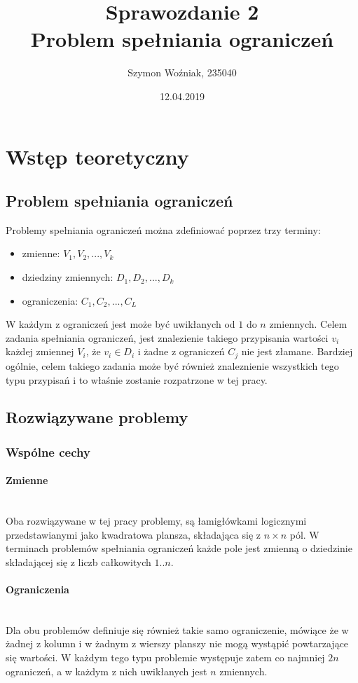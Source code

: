 \documentclass{article}
\author{Szymon Woźniak, 235040}
\date{12.04.2019}
\title{Sprawozdanie 2\\Problem spełniania ograniczeń}
\begin{document}
	\maketitle
	\newpage
	
	\section{Wstęp teoretyczny}
	\subsection{Problem spełniania ograniczeń}
	Problemy spełniania ograniczeń można zdefiniować poprzez trzy terminy: 
	\begin{itemize}
		\item zmienne: $V_{1}, V_{2}, ..., V_{k}$
		\item dziedziny zmiennych: $D_{1}, D_{2}, ..., D_{k}$
		\item ograniczenia: $C_{1}, C_{2}, ..., C_{L}$
	\end{itemize}
	W każdym z ograniczeń jest może być uwikłanych od $1$ do $n$ zmiennych.
	Celem zadania spełniania ograniczeń, jest znalezienie takiego przypisania wartości $v_i$ każdej zmiennej $V_i$, że $v_i \in D_i$ i żadne z ograniczeń $C_j$ nie jest złamane.
	Bardziej ogólnie, celem takiego zadania może być również znaleznienie wszystkich tego typu przypisań i to właśnie zostanie rozpatrzone w tej pracy.
	\subsection{Rozwiązywane problemy}
	\subsubsection{Wspólne cechy}
	\paragraph{Zmienne}\mbox{}\\
	Oba rozwiązywane w tej pracy problemy, są łamigłówkami logicznymi przedstawianymi jako kwadratowa plansza, składająca się z $n \times n$ pól. W terminach problemów spełniania ograniczeń każde pole jest zmienną o dziedzinie składającej się z liczb całkowitych $1..n$.
	\paragraph{Ograniczenia}\mbox{}\\
	Dla obu problemów definiuje się również takie samo ograniczenie, mówiące że w żadnej z kolumn i w żadnym z wierszy planszy nie mogą wystąpić powtarzające się wartości. W każdym tego typu problemie występuje zatem co najmniej $2n$ ograniczeń, a w każdym z nich uwikłanych jest $n$ zmiennych.
	
\end{document}
